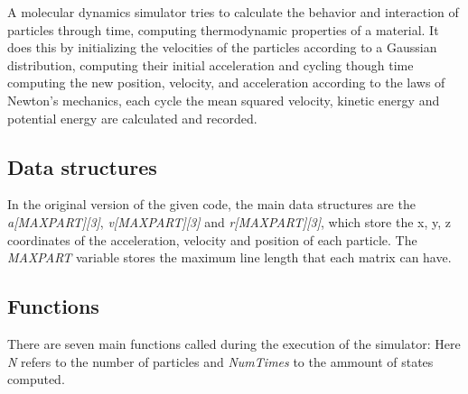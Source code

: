 \documentclass[conference]{IEEEtran}
\begin{document}
A molecular dynamics simulator tries to calculate the behavior and interaction of particles through time, computing thermodynamic properties of a material.
It does this by initializing the velocities of the particles according to a Gaussian distribution, computing their initial acceleration and cycling though time computing the new position, velocity, and acceleration according to the laws of Newton's mechanics, each cycle the mean squared velocity, kinetic energy and potential energy are calculated and recorded. 


\subsection{Data structures}

In the original version of the given code, the main data structures are the \textit{a[MAXPART][3]}, \textit{v[MAXPART][3]} and \textit{r[MAXPART][3]}, which store the x, y, z coordinates of the acceleration, velocity and position of each particle. The \textit{MAXPART} variable stores the maximum line length that each matrix can have.

\subsection{Functions}\label{AA}
There are seven main functions called during the execution of the simulator:
Here \textit{N} refers to the number of particles and \textit{NumTimes} to the ammount of states computed.
\end{document}
